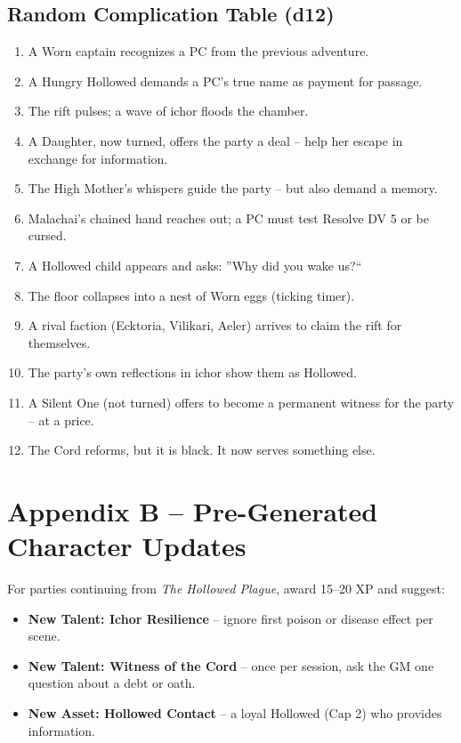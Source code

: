 \documentclass[10pt,twoside]{book}
\begin{document}
\section{Random Complication Table (d12)}
\begin{enumerate}
\item A Worn captain recognizes a PC from the previous adventure.
\item A Hungry Hollowed demands a PC's true name as payment for passage.
\item The rift pulses; a wave of ichor floods the chamber.
\item A Daughter, now turned, offers the party a deal -- help her escape in exchange for information.
\item The High Mother's whispers guide the party -- but also demand a memory.
\item Malachai's chained hand reaches out; a PC must test Resolve DV 5 or be cursed.
\item A Hollowed child appears and asks: ''Why did you wake us?``
\item The floor collapses into a nest of Worn eggs (ticking timer).
\item A rival faction (Ecktoria, Vilikari, Aeler) arrives to claim the rift for themselves.
\item The party's own reflections in ichor show them as Hollowed.
\item A Silent One (not turned) offers to become a permanent witness for the party -- at a price.
\item The Cord reforms, but it is black. It now serves something else.
\end{enumerate}

\chapter{Appendix B -- Pre-Generated Character Updates}
For parties continuing from \textit{The Hollowed Plague}, award 15--20 XP and suggest:

\begin{itemize}
\item \textbf{New Talent: Ichor Resilience} -- ignore first poison or disease effect per scene.
\item \textbf{New Talent: Witness of the Cord} -- once per session, ask the GM one question about a debt or oath.
\item \textbf{New Asset: Hollowed Contact} -- a loyal Hollowed (Cap 2) who provides information.
\end{itemize}
\end{document}
